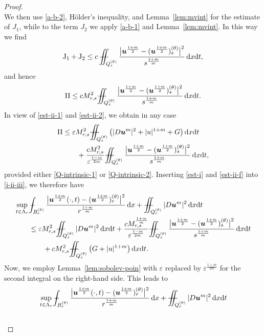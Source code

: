 \documentclass[a4paper, 10pt, american]{amsart}
\numberwithin{theorem}{section}
\numberwithin{equation}{section}
\newcommand{\dxdt}{\,\mathrm{d}x\mathrm{d}t}
\newcommand{\dx}{\,\mathrm{d}x}
\renewcommand{\epsilon}{\varepsilon}
\renewcommand{\epsilon}{\varepsilon}
\newcommand{\power}[2]{\bm{#1^{\mbox{\unboldmath{\scriptsize$#2$}}}}}
\def\Xint#1{\mathchoice
    {\XXint\displaystyle\textstyle{#1}}%
    {\XXint\textstyle\scriptstyle{#1}}%
    {\XXint\scriptstyle\scriptscriptstyle{#1}}%
    {\XXint\scriptscriptstyle\scriptscriptstyle{#1}}%
    \!\int}
\def\XXint#1#2#3{\setbox0=\hbox{$#1{#2#3}{\int}$}
    \vcenter{\hbox{$#2#3$}}\kern-0.5\wd0}
\def\bint{\Xint-}
\def\Xiint#1{\mathchoice
    {\XXiint\displaystyle\textstyle{#1}}%
    {\XXiint\textstyle\scriptstyle{#1}}%
    {\XXiint\scriptstyle\scriptscriptstyle{#1}}%
    {\XXiint\scriptscriptstyle\scriptscriptstyle{#1}}%
    \!\iint}
\def\XXiint#1#2#3{\setbox0=\hbox{$#1{#2#3}{\iint}$}
    \vcenter{\hbox{$#2#3$}}\kern-0.5\wd0}
\def\biint{\Xiint{-\!-}}
\begin{document}
\begin{proof}
$$$$
We then use \eqref{a-b-2}, H\"older's inequality, and Lemma~\ref{lem:mvint} for the estimate of $J_1$, while to the term $J_2$ we apply \eqref{a-b-1} and Lemma~\ref{lem:mvint}. In this way we find
\begin{align}
{\rm{J_1+J_2}}
\le
c\, \biint_{Q_s^{(\theta)}}\frac{\big|\power u{\frac{1+m}2}-( \power u{\frac{1+m}2})_s^{(\theta)} \big|^2}{s^\frac{1+m}m}\dxdt ,
\end{align}
and hence
\begin{align}\label{est-ii-2}
{\rm{II}}
\le
cM_{r,s}^2 \biint_{Q_s^{(\theta)}}\frac{\big|\power u{\frac{1+m}2}-( \power u{\frac{1+m}2})_s^{(\theta)} \big|^2}{s^\frac{1+m}m}\dxdt.
\end{align}
In view of \eqref{est-ii-1} and \eqref{est-ii-2},
we obtain in any case 
\begin{align}\label{est-ii-f}
{\rm{II}}
&\le
\epsilon M_{r,s}^2\biint_{Q_s^{(\theta)}}\big(|D\power um|^2+|u|^{1+m}+G\big)\dxdt\nonumber\\
&\qquad+
\frac{cM_{r,s}^2}{\epsilon^\frac{1-m}{2m}}\biint_{Q_s^{(\theta)}}\frac{\big|\power u{\frac{1+m}2}-( \power u{\frac{1+m}2})_s^{(\theta)} \big|^2}{s^\frac{1+m}m}\dxdt,
\end{align}
provided either \eqref{Q-intrinsic-1} or \eqref{Q-intrinsic-2}.
Inserting \eqref{est-i} and \eqref{est-ii-f} into \eqref{i-ii-iii}, we therefore have
\begin{align}
\nonumber
&\sup_{t\in\Lambda_r}\bint_{B_r^{(\theta)}}\frac{\big|\power u{\frac{1+m}2}(\cdot,t)-(\power u{\frac{1+m}2})_r^{(\theta)}\big|^2}{r^\frac{1+m}m}\dx
+
\biint_{Q_r^{(\theta)}}|D\power um|^2\dxdt\\\nonumber
&\qquad\le
\epsilon M_{r,s}^2\biint_{Q_s^{(\theta)}} |D\power um|^2 \dxdt
+
\frac{cM_{r,s}^\frac{1+m}m}{\epsilon^\frac{1-m}{2m}}\biint_{Q_s^{(\theta)}}\frac{\big|\power u{\frac{1+m}2}-( \power u{\frac{1+m}2})_s^{(\theta)} \big|^2}{s^\frac{1+m}m}\dxdt\\\nonumber
&\qquad\qquad+
cM_{r,s}^2\biint_{Q_s^{(\theta)}}\big(G+|u|^{1+m}\big)\dxdt.
\end{align}
Now, we employ Lemma~\ref{lem:sobolev-poin} with $\epsilon$ replaced
by $\epsilon^\frac{1+m}{2m}$ for the second integral on the right-hand side. This leads to
\begin{align}
\nonumber
&\sup_{t\in\Lambda_r}\bint_{B_r^{(\theta)}}\frac{\big|\power u{\frac{1+m}2}(\cdot,t)-(\power u{\frac{1+m}2})_r^{(\theta)}\big|^2}{r^\frac{1+m}m}\dx
+
\biint_{Q_r^{(\theta)}}|D\power um|^2\dxdt\\\nonumber

\end{align}
\end{proof}
\end{document}
